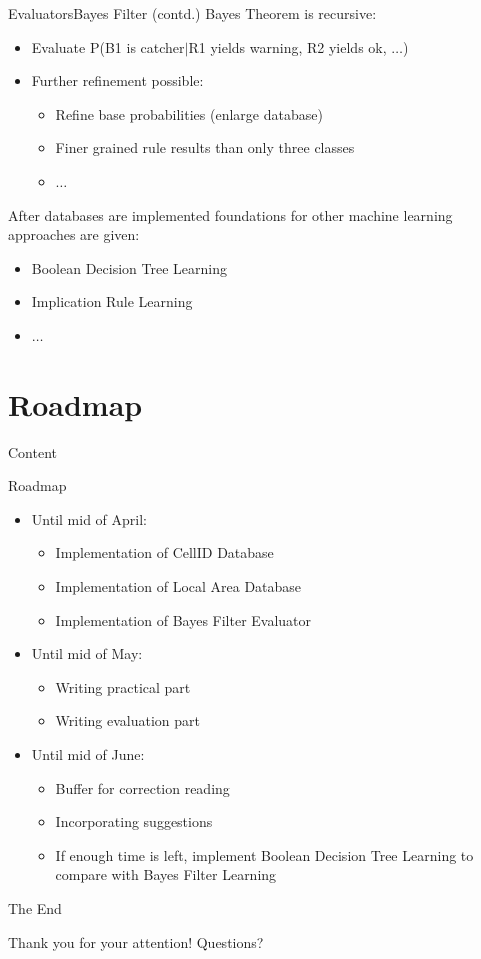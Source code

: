 \documentclass{beamer}
\newcommand{\tocsection}[1]{
  \section{#1}
  \begin{frame}{Content}
    \tableofcontents[sectionstyle=show/shaded,subsectionstyle=show/show/hide]
  \end{frame}
 }
\begin{document}
\begin{frame}{Evaluators}{Bayes Filter (contd.)}
Bayes Theorem is recursive:
\begin{itemize}
	\item Evaluate P(B1 is catcher$\vert$R1 yields warning, R2 yields ok, $\ldots$)
	\item Further refinement possible:
	\begin{itemize}
		\item Refine base probabilities (enlarge database)
		\item Finer grained rule results than only three classes
		\item $\ldots$
	\end{itemize}
\end{itemize}
After databases are implemented foundations for other machine learning approaches are given:
\begin{itemize}
	\item Boolean Decision Tree Learning
	\item Implication Rule Learning
	\item $\ldots$
\end{itemize}
\end{frame}

\tocsection{Roadmap}
\begin{frame}{Roadmap}
\begin{itemize}
	\item Until mid of April:
	\begin{itemize}
		\item Implementation of CellID Database
		\item Implementation of Local Area Database
		\item Implementation of Bayes Filter Evaluator
	\end{itemize}
	\item Until mid of May:
	\begin{itemize}
		\item Writing practical part
		\item Writing evaluation part
	\end{itemize}
	\item Until mid of June:
	\begin{itemize}
		\item Buffer for correction reading
		\item Incorporating suggestions
		\item If enough time is left, implement Boolean Decision Tree Learning to compare with Bayes Filter Learning 
	\end{itemize}
\end{itemize}
\end{frame}
\begin{frame}{The End}
\begin{center}
	\huge{Thank you for your attention! Questions?}
\end{center}
\end{frame}
\end{document}
